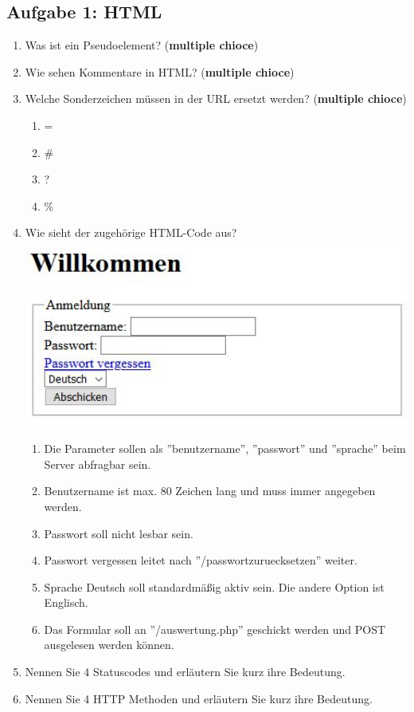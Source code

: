 \subsection{Aufgabe 1: HTML}
\label{sec:Aufgabe1}
\begin{enumerate}[label=\alph*)]
    \item Was ist ein Pseudoelement? (\textbf{multiple chioce})
    \item Wie sehen Kommentare in HTML? (\textbf{multiple chioce})
    \item Welche Sonderzeichen müssen in der URL ersetzt werden? (\textbf{multiple chioce})
        \begin{enumerate}[label=\arabic*.]
        \item =
        \item \#
        \item ?
        \item \%
        \end{enumerate}
    \item Wie sieht der zugehörige HTML-Code aus? \\
        \includegraphics[width=15cm]{img/klausur.JPG}
        \begin{enumerate}[label=\arabic*.]
            \item Die Parameter sollen als ''benutzername'', ''passwort'' und
                ''sprache'' beim Server abfragbar sein.
            \item Benutzername ist max. 80 Zeichen lang und muss immer angegeben werden.
            \item Passwort soll nicht lesbar sein.
            \item Passwort vergessen leitet nach ''/passwortzuruecksetzen'' weiter.
            \item Sprache Deutsch soll standardmäßig aktiv sein. Die andere Option
                ist Englisch.
            \item Das Formular soll an ''/auswertung.php'' geschickt werden und
                POST ausgelesen werden können.
         \end{enumerate}
    \item Nennen Sie 4 Statuscodes und erläutern Sie kurz ihre Bedeutung.
    \item Nennen Sie 4 HTTP Methoden und erläutern Sie kurz ihre Bedeutung.
\end{enumerate}
